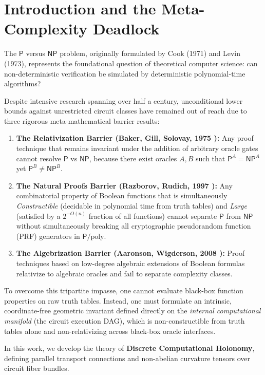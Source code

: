 \documentclass[11pt,a4paper]{article}
\newcommand{\NP}{\mathsf{NP}}
\renewcommand{\P}{\mathsf{P}}
\begin{document}
\newpage
\tableofcontents
\newpage

\section{Introduction and the Meta-Complexity Deadlock}
The $\P$ versus $\NP$ problem, originally formulated by Cook (1971) and Levin (1973), represents the foundational question of theoretical computer science: can non-deterministic verification be simulated by deterministic polynomial-time algorithms?

Despite intensive research spanning over half a century, unconditional lower bounds against unrestricted circuit classes have remained out of reach due to three rigorous meta-mathematical barrier results:
\begin{enumerate}
    \item \textbf{The Relativization Barrier (Baker, Gill, Solovay, 1975 \cite{bgs75}):} Any proof technique that remains invariant under the addition of arbitrary oracle gates cannot resolve $\P$ vs $\NP$, because there exist oracles $A, B$ such that $\P^A = \NP^A$ yet $\P^B \neq \NP^B$.
    \item \textbf{The Natural Proofs Barrier (Razborov, Rudich, 1997 \cite{rr97}):} Any combinatorial property of Boolean functions that is simultaneously \emph{Constructible} (decidable in polynomial time from truth tables) and \emph{Large} (satisfied by a $2^{-O(n)}$ fraction of all functions) cannot separate $\P$ from $\NP$ without simultaneously breaking all cryptographic pseudorandom function (PRF) generators in $\P/\mathrm{poly}$.
    \item \textbf{The Algebrization Barrier (Aaronson, Wigderson, 2008 \cite{aw08}):} Proof techniques based on low-degree algebraic extensions of Boolean formulas relativize to algebraic oracles and fail to separate complexity classes.
\end{enumerate}

To overcome this tripartite impasse, one cannot evaluate black-box function properties on raw truth tables. Instead, one must formulate an intrinsic, coordinate-free geometric invariant defined directly on the \emph{internal computational manifold} (the circuit execution DAG), which is non-constructible from truth tables alone and non-relativizing across black-box oracle interfaces.

In this work, we develop the theory of \textbf{Discrete Computational Holonomy}, defining parallel transport connections and non-abelian curvature tensors over circuit fiber bundles.
\end{document}
